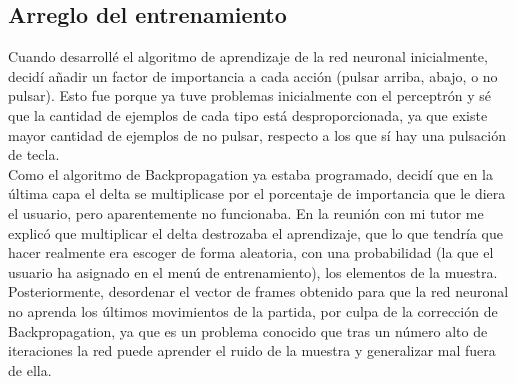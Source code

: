 \subsection{Arreglo del entrenamiento}
Cuando desarrollé el algoritmo de aprendizaje de la red neuronal inicialmente, decidí añadir un factor de importancia a cada acción (pulsar arriba, abajo, o no pulsar). Esto fue porque ya tuve problemas inicialmente con el perceptrón y sé que la cantidad de ejemplos de cada tipo está desproporcionada, ya que existe mayor cantidad de ejemplos de no pulsar, respecto a los que sí hay una pulsación de tecla.
\\
Como el algoritmo de Backpropagation ya estaba programado, decidí que en la última capa el delta se multiplicase por el porcentaje de importancia que le diera el usuario, pero aparentemente no funcionaba. En la reunión con mi tutor me explicó que multiplicar el delta destrozaba el aprendizaje, que lo que tendría que hacer realmente era escoger de forma aleatoria, con una probabilidad (la que el usuario ha asignado en el menú de entrenamiento), los elementos de la muestra. Posteriormente, desordenar el vector de frames obtenido para que la red neuronal no aprenda los últimos movimientos de la partida, por culpa de la corrección de Backpropagation, ya que es un problema conocido que tras un número alto de iteraciones la red puede aprender el ruido de la muestra y generalizar mal fuera de ella.

